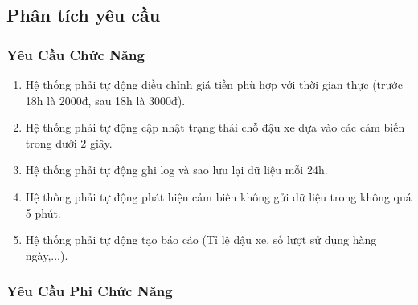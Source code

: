 \subsection{\textbf{Phân tích yêu cầu}}

\subsubsection{Yêu Cầu Chức Năng}




\begin{enumerate}
    \item [-] Hệ thống phải tự động điều chỉnh giá tiền phù hợp với thời gian thực (trước 18h là 2000đ, sau 18h là 3000đ).
    \item [-] Hệ thống phải tự động cập nhật trạng thái chỗ đậu xe dựa vào các cảm biến trong dưới 2 giây.
    \item [-] Hệ thống phải tự động ghi log và sao lưu lại dữ liệu mỗi 24h.
    \item [-] Hệ thống phải tự động phát hiện cảm biến không gửi dữ liệu trong không quá 5 phút.
    \item [-] Hệ thống phải tự động tạo báo cáo (Tỉ lệ đậu xe, số lượt sử dụng hàng ngày,...).
\end{enumerate}

\subsubsection{Yêu Cầu Phi Chức Năng}


